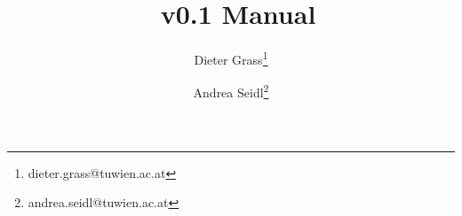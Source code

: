 \begin{titlepage}
\title{\OCT\ v0.1 Manual}
\author{Dieter Grass\thanks{dieter.grass@tuwien.ac.at} \and Andrea Seidl\thanks{andrea.seidl@tuwien.ac.at}}
\date{}
\maketitle
\end{titlepage}
